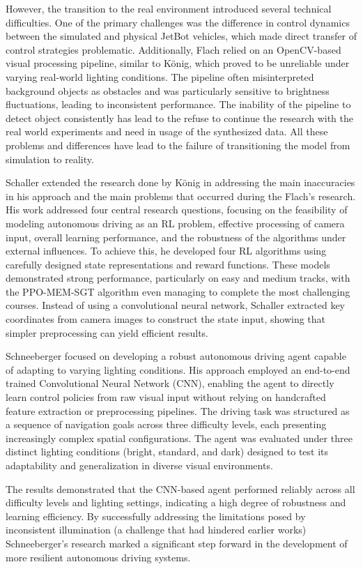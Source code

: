 However, the transition to the real environment introduced several technical difficulties. One of the primary challenges was the difference in control dynamics between the simulated and physical JetBot vehicles, which made direct transfer of control strategies problematic. Additionally, Flach relied on an OpenCV-based visual processing pipeline, similar to König, which proved to be unreliable under varying real-world lighting conditions. The pipeline often misinterpreted background objects as obstacles and was particularly sensitive to brightness fluctuations, leading to inconsistent performance. The inability of the pipeline to detect object consistently has lead to the refuse to continue the research with the real world experiments and need in usage of the synthesized data. All these problems and differences have lead to the failure of transitioning the model from simulation to reality.

Schaller \autocite{schaller2023train} extended the research done by König \autocite{konig2022model} in addressing the main inaccuracies in his approach and the main problems that occurred during the Flach's \autocite{flach2023methods} research. His work addressed four central research questions, focusing on the feasibility of modeling autonomous driving as an RL problem, effective processing of camera input, overall learning performance, and the robustness of the algorithms under external influences. To achieve this, he developed four RL algorithms using carefully designed state representations and reward functions. These models demonstrated strong performance, particularly on easy and medium tracks, with the PPO-MEM-SGT algorithm even managing to complete the most challenging courses. Instead of using a convolutional neural network, Schaller \autocite{schaller2023train} extracted key coordinates from camera images to construct the state input, showing that simpler preprocessing can yield efficient results.

Schneeberger \autocite{schneeberger2024end} focused on developing a robust autonomous driving agent capable of adapting to varying lighting conditions. His approach employed an end-to-end trained Convolutional Neural Network (CNN), enabling the agent to directly learn control policies from raw visual input without relying on handcrafted feature extraction or preprocessing pipelines. The driving task was structured as a sequence of navigation goals across three difficulty levels, each presenting increasingly complex spatial configurations. The agent was evaluated under three distinct lighting conditions (bright, standard, and dark) designed to test its adaptability and generalization in diverse visual environments.

The results demonstrated that the CNN-based agent performed reliably across all difficulty levels and lighting settings, indicating a high degree of robustness and learning efficiency. By successfully addressing the limitations posed by inconsistent illumination (a challenge that had hindered earlier works) Schneeberger’s \autocite{schneeberger2024end} research marked a significant step forward in the development of more resilient autonomous driving systems.
